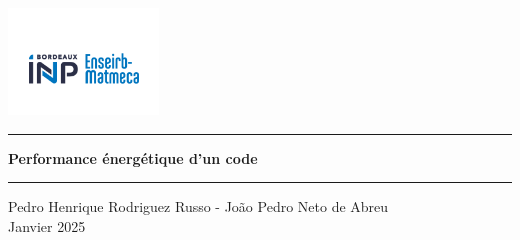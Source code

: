 \begin{center}
  \includegraphics[width=0.3\textwidth]{images/logo.png}
  
  \noindent\rule{\textwidth}{1pt}
  
  \vspace{1cm}
  
  {\LARGE\bfseries Performance énergétique d'un code}
  
  \vspace{0.5cm}
  \noindent\rule{\textwidth}{1pt} 
  \vspace{1cm}
  
  {\large Pedro Henrique Rodriguez Russo - Jo\~ao Pedro Neto de Abreu} \\
  \vspace{0.3cm}
         {\normalsize Janvier 2025}
\end{center}
